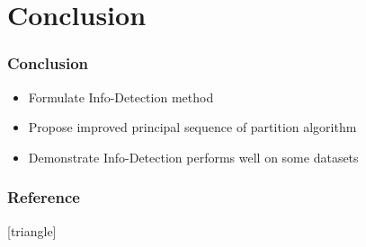 \documentclass[notheorems]{beamer}
\begin{document}
\section{Conclusion}
\begin{frame}
\frametitle{Conclusion}
\begin{itemize}
\item Formulate Info-Detection method
\item Propose improved principal sequence of partition algorithm 
\item Demonstrate Info-Detection performs well on some datasets
\end{itemize}
\end{frame}
\begin{frame}
\frametitle{Reference}
[triangle]

{\footnotesize

}
\end{frame}
\end{document}
